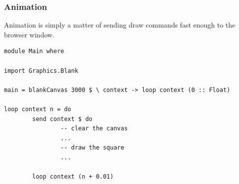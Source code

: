 \documentclass{beamer}
\begin{document}
\begin{frame}[fragile]
\frametitle{Animation}

\Large
Animation is simply a matter of sending draw commands fast enough to the
browser window.

\begin{codeblock}[0.9]
\footnotesize
\begin{verbatim}
module Main where

import Graphics.Blank

main = blankCanvas 3000 $ \ context -> loop context (0 :: Float)

loop context n = do
        send context $ do
                -- clear the canvas
                ...
                -- draw the square
                ...
                
        loop context (n + 0.01)
\end{verbatim}
\end{codeblock}

\end{frame}
\end{document}
